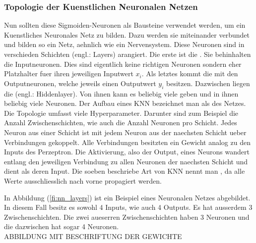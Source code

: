 \documentclass[../main]{subfiles}
\begin{document}
\subsubsection{Topologie der Kuenstlichen Neuronalen Netzen}
Nun sollten diese Sigmoiden-Neuronen als Bausteine verwendet werden, um ein Kuenstliches
Neuronales Netz zu bilden. Dazu werden sie miteinander verbundet und bilden so ein Netz,
aehnlich wie ein Nervensystem.
Diese Neuronen sind in verschieden Schichten (engl.: Layers)
arangiert. Die erste ist die . Sie behinhalten die
Inputneuronen. Dies sind eigentlich keine richtigen
Neuronen sondern eher Platzhalter fuer ihren jeweiligen Inputwert $x_i$. Als letztes kommt die
 mit den Outputneuronen, welche jeweils einen Outputwert $y_i$
besitzen. Dazwischen liegen die  (engl.: Hiddenlayer). Von ihnen kann es
beliebig viele geben und in ihnen beliebig viele Neuronen.
Der Aufbau eines KNN bezeichnet man als  des Netzes. Die
Topologie umfasst viele Hyperparameter. Darunter sind zum Beispiel die Anzahl Zwischenschichten, wie auch
die Anzahl Neuronen pro Schicht.
\para
Jedes Neuron aus einer Schicht ist mit jedem Neuron aus der naechsten Schicht ueber
Verbindungen gekoppelt. Alle Verbindungen besitzten ein Gewicht analog zu den Inputs des
Perzeptron. Die Aktivierung, also der Output, eines Neurons wandert entlang den jeweiligen
Verbindung zu allen Neuronen der naechsten Schicht und dient als deren Input.
Die soeben beschriebe Art von KNN nennt man , da alle Werte
ausschliesslich nach vorne propagiert werden.

In Abbildung (\ref{fi:nn_layers}) ist ein Beispiel eines Neuronalen Netzes
abgebildet. In diesem Fall besitz es sowohl 4 Inputs, wie auch 4 Outputs. Es hat
ausserdem 3 Zwischenschichten. Die zwei aueserren Zwischenschichten haben 3 Neuronen und die dazwischen
hat sogar 4 Neuronen.
\\ABBILDUNG MIT BESCHRIFTUNG DER GEWICHTE
\end{document}
